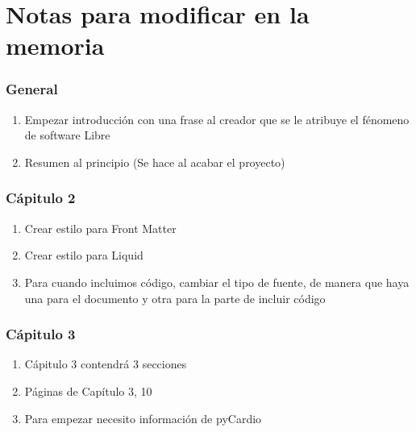 \documentclass[a4paper, 12pt]{book}
\begin{document}
\chapter*{Notas para modificar en la memoria}
\subsection*{General}
\begin{enumerate}
    \item Empezar introducción con una frase al creador que se le atribuye el fénomeno de  software Libre
    \item Resumen al principio (Se hace al acabar el proyecto) 
\end{enumerate}
\subsection*{Cápitulo 2}
\begin{enumerate}
    \item Crear estilo para Front Matter
    \item Crear estilo para Liquid
    \item Para cuando incluimos código, cambiar el tipo de fuente, de manera que haya una para el documento y otra para la parte de incluir código
\end{enumerate}
\subsection*{Cápitulo 3}
\begin{enumerate}
    \item Cápitulo 3 contendrá 3 secciones
    \item Páginas de Capítulo 3, 10
    \item Para empezar necesito información de pyCardio
\end{enumerate}
\end{document}
